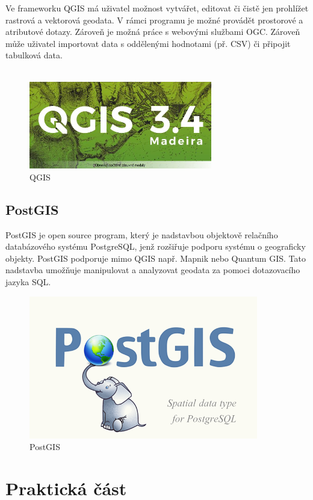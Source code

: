 \documentclass[a4paper, 12pt]{article}
\begin{document}
Ve frameworku QGIS má uživatel možnost vytvářet, editovat či čistě jen prohlížet rastrová a vektorová geodata. V rámci programu je možné provádět prostorové a atributové dotazy. Zároveň je možná práce s webovými službami OGC. Zároveň může uživatel importovat data s oddělenými hodnotami (př. CSV) či připojit tabulková data.\\
\\

\begin{figure}[h!]
	\centering
	\includegraphics[width=8cm]{pictures/qgis.jpg}
	\caption{QGIS}
\end{figure}

\subsection{PostGIS}
PostGIS je open source program, který je nadstavbou objektově relačního databázového systému PostgreSQL, jenž rozšiřuje podporu systému o geograficky objekty. PostGIS podporuje mimo QGIS např. Mapnik nebo Quantum GIS. Tato nadstavba umožňuje manipulovat a analyzovat geodata za pomoci dotazovacího jazyka SQL. 

\begin{figure}[h!]
	\centering
	\includegraphics[width=10cm]{pictures/postgis.png}
	\caption{PostGIS}
\end{figure}


\section{Praktická část}
\end{document}
